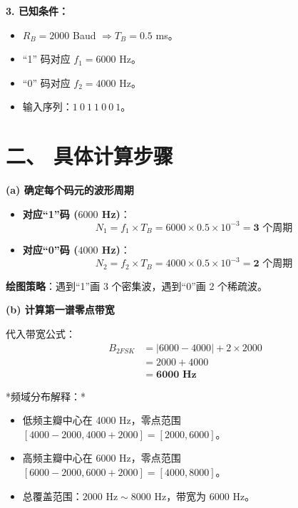 \documentclass[a4paper,11pt]{ctexart}
\begin{document}
\begin{enumerate}[label=\textbf{7-\arabic*}]
\begin{tcolorbox}[colback=white, colframe=blue!50!black, title=\textbf{题目解答：7-2 2FSK 系统的波形、带宽与解调}]
    \textbf{3. 已知条件：}
    \begin{itemize}
        \item $R_B = 2000$ Baud $\Rightarrow T_B = 0.5$ ms。
        \item “1” 码对应 $f_1 = 6000$ Hz。
        \item “0” 码对应 $f_2 = 4000$ Hz。
        \item 输入序列：$1 \ 0 \ 1 \ 1 \ 0 \ 0 \ 1$。
    \end{itemize}

    \end{tcolorbox}    


    \section*{二、 具体计算步骤}
    
    \textbf{(a) 确定每个码元的波形周期}
    
    \begin{itemize}
        \item \textbf{对应“1”码 ($6000$ Hz)}：
            $$ N_1 = f_1 \times T_B = 6000 \times 0.5 \times 10^{-3} = \mathbf{3} \text{ 个周期} $$
        \item \textbf{对应“0”码 ($4000$ Hz)}：
            $$ N_2 = f_2 \times T_B = 4000 \times 0.5 \times 10^{-3} = \mathbf{2} \text{ 个周期} $$
    \end{itemize}
    \textbf{绘图策略}：遇到“1”画 3 个密集波，遇到“0”画 2 个稀疏波。
    
    \textbf{(b) 计算第一谱零点带宽}
    
    代入带宽公式：
    \begin{align*}
        B_{2FSK} &= |6000 - 4000| + 2 \times 2000 \\
                 &= 2000 + 4000 \\
                 &= \mathbf{6000 \text{ Hz}}
    \end{align*}
    
    *频域分布解释：* 
    \begin{itemize}
        \item 低频主瓣中心在 4000 Hz，零点范围 $[4000-2000, 4000+2000] = [2000, 6000]$。
        \item 高频主瓣中心在 6000 Hz，零点范围 $[6000-2000, 6000+2000] = [4000, 8000]$。
        \item 总覆盖范围：$2000 \text{ Hz} \sim 8000 \text{ Hz}$，带宽为 $6000$ Hz。
    \end{itemize}



\end{enumerate}
\end{document}
